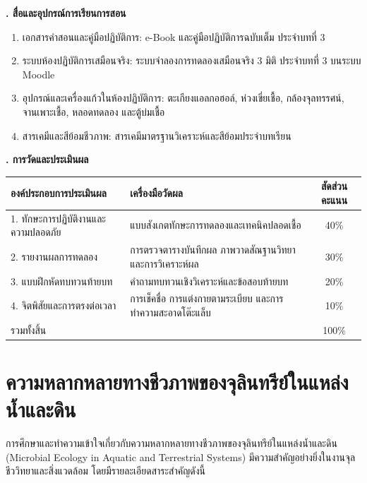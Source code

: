 \noindent\textbf{. สื่อและอุปกรณ์การเรียนการสอน}

\begin{enumerate}
    \item เอกสารคำสอนและคู่มือปฏิบัติการ: e-Book และคู่มือปฏิบัติการฉบับเต็ม ประจำบทที่ 3
    \item ระบบห้องปฏิบัติการเสมือนจริง: ระบบจำลองการทดลองเสมือนจริง 3 มิติ ประจำบทที่ 3 บนระบบ Moodle
    \item อุปกรณ์และเครื่องแก้วในห้องปฏิบัติการ: ตะเกียงแอลกอฮอล์, ห่วงเขี่ยเชื้อ, กล้องจุลทรรศน์, จานเพาะเชื้อ, หลอดทดลอง และตู้บ่มเชื้อ
    \item สารเคมีและสีย้อมชีวภาพ: สารเคมีมาตรฐานวิเคราะห์และสีย้อมประจำบทเรียน
\end{enumerate}

\noindent\textbf{. การวัดและประเมินผล}

\begin{table}[H]
\centering\small
\begin{tabularx}{\textwidth}{p{} p{} c}
\toprule
\textbf{องค์ประกอบการประเมินผล} & \textbf{เครื่องมือวัดผล} & \textbf{สัดส่วนคะแนน} \\
\midrule
1. ทักษะการปฏิบัติงานและความปลอดภัย & แบบสังเกตทักษะการทดลองและเทคนิคปลอดเชื้อ & 40\% \\
2. รายงานผลการทดลอง & การตรวจตารางบันทึกผล ภาพวาดสัณฐานวิทยา และการวิเคราะห์ผล & 30\% \\
3. แบบฝึกหัดทบทวนท้ายบท & คำถามทบทวนเชิงวิเคราะห์และข้อสอบท้ายบท & 20\% \\
4. จิตพิสัยและการตรงต่อเวลา & การเช็คชื่อ การแต่งกายตามระเบียบ และการทำความสะอาดโต๊ะแล็บ & 10\% \\
รวมทั้งสิ้น &  & 100\% \\
\bottomrule
\end{tabularx}
\end{table}

\newpage


\section{ความหลากหลายทางชีวภาพของจุลินทรีย์ในแหล่งน้ำและดิน}

การศึกษาและทำความเข้าใจเกี่ยวกับความหลากหลายทางชีวภาพของจุลินทรีย์ในแหล่งน้ำและดิน (Microbial Ecology in Aquatic and Terrestrial Systems) มีความสำคัญอย่างยิ่งในงานจุลชีววิทยาและสิ่งแวดล้อม โดยมีรายละเอียดสาระสำคัญดังนี้

